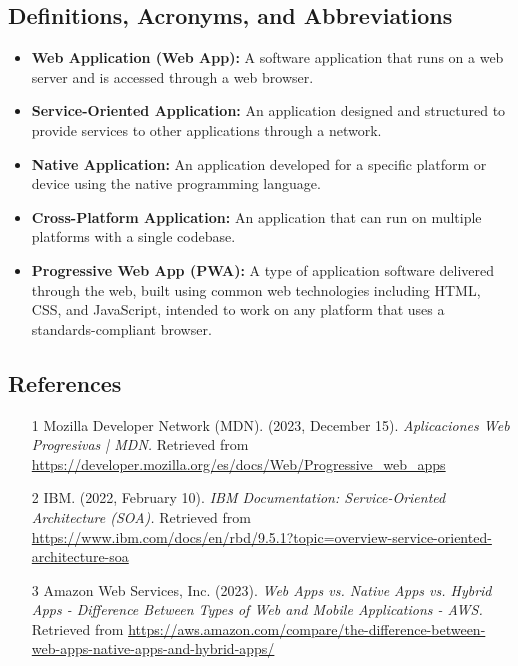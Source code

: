 \documentclass[12pt, a4paper, twoside]{article}
\begin{document}
\subsection{Definitions, Acronyms, and Abbreviations}
\label{sec:definitions}

\begin{itemize}
  \item \textbf{Web Application (Web App):} A software application that runs on a web server and is accessed through a web browser.
  
  \item \textbf{Service-Oriented Application:} An application designed and structured to provide services to other applications through a network.
  
  \item \textbf{Native Application:} An application developed for a specific platform or device using the native programming language.
  
  \item \textbf{Cross-Platform Application:} An application that can run on multiple platforms with a single codebase.
  
  \item \textbf{Progressive Web App (PWA):} A type of application software delivered through the web, built using common web technologies including HTML, CSS, and JavaScript, intended to work on any platform that uses a standards-compliant browser.
\end{itemize}

\subsection{References}
\label{sec:references}

\begin{enumerate}
    \item [1] Mozilla Developer Network (MDN). (2023, December 15). 
    \textit{Aplicaciones Web Progresivas | MDN.} Retrieved from \url{https://developer.mozilla.org/es/docs/Web/Progressive_web_apps}
      
    \item [2] IBM. (2022, February 10). 
    \textit{IBM Documentation: Service-Oriented Architecture (SOA).} Retrieved from \url{https://www.ibm.com/docs/en/rbd/9.5.1?topic=overview-service-oriented-architecture-soa}

    \item [3] Amazon Web Services, Inc. (2023). 
    \textit{Web Apps vs. Native Apps vs. Hybrid Apps - Difference Between Types of Web and Mobile Applications - AWS.} Retrieved from 
    \url{https://aws.amazon.com/compare/the-difference-between-web-apps-native-apps-and-hybrid-apps/}
\end{enumerate}
\end{document}
